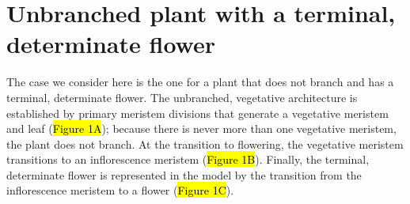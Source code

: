 \documentclass[12pt, oneside]{article}   	%
\begin{document}
 

\section*{Unbranched plant with a terminal, determinate flower}

The case we consider here is the one for a plant that does not branch and has a terminal, determinate flower. The unbranched, vegetative architecture is established by primary meristem divisions that generate a vegetative meristem and leaf (\hl{Figure 1A}); because there is never more than one vegetative meristem, the plant does not branch. At the transition to flowering, the vegetative meristem transitions to an inflorescence meristem (\hl{Figure 1B}). Finally, the terminal, determinate flower is represented in the model by the transition from the inflorescence meristem to a flower (\hl{Figure 1C}).
\end{document}
